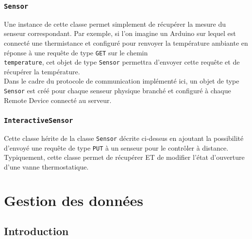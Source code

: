\documentclass[11pt,a4paper,11pt]{report}
\begin{document}

\subsubsection{\texttt{Sensor}}
Une instance de cette classe permet simplement de récupérer la mesure du senseur correspondant. Par exemple, si l'on imagine un Arduino sur lequel est connecté une thermistance et configuré pour renvoyer la température ambiante en réponse à une requête de type \texttt{GET} sur le chemin \texttt{\\temperature}, cet objet de type \texttt{Sensor} permettra d'envoyer cette requête et de récupérer la température. \\

Dans le cadre du protocole de communication implémenté ici, un objet de type \texttt{Sensor} est créé pour chaque senseur physique branché et configuré à chaque Remote Device connecté au serveur.

\subsubsection{\texttt{InteractiveSensor}}

Cette classe hérite de la classe \texttt{Sensor} décrite ci-dessus en ajoutant la possibilité d'envoyé une requête de type \texttt{PUT} à un senseur pour le contrôler à distance. Typiquement, cette classe permet de récupérer ET de modifier l'état d'ouverture d'une vanne thermostatique.


\section{Gestion des données}

\subsection{Introduction}
\end{document}
